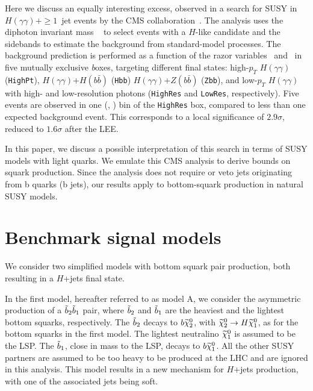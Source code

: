Here we discuss an equally interesting excess, observed in a search for SUSY in $H (\gamma\gamma)+ \geq 1$~jet events by the CMS collaboration~\cite{RazorHgaga}. The analysis uses the diphoton invariant mass \mgaga~ to select events with a $H$-like candidate and the \mgaga~ sidebands to estimate the background from standard-model processes. The background prediction is performed as a function of the razor variables \MR~and \Rsq~in five mutually exclusive {\textit boxes}, targeting different final states: high-$p_T$ $H (\gamma\gamma)$ (\texttt{HighPt}), $H (\gamma\gamma)$+$H (b \bar b)$ (\texttt{Hbb}) $H (\gamma\gamma)$+$Z (b \bar b)$ (\texttt{Zbb}), and low-$p_T$ $H (\gamma\gamma)$ with high- and low-resolution photons (\texttt{HighRes} and \texttt{LowRes}, respectively). Five events are observed in one (\MR, \Rsq) bin of the \texttt{HighRes} box, compared to less than one expected background event. This corresponds to a local significance of $2.9\sigma$, reduced to $1.6\sigma$ after the LEE. 

In this paper, we discuss a possible interpretation of this search in terms of SUSY models with light quarks. We emulate this CMS analysis to derive bounds on squark production. Since the analysis does not require or veto jets originating from b quarks (b jets), our results apply to bottom-squark production in natural SUSY models. 

\section{Benchmark signal models}
\label{sec:models}

We consider two simplified models with bottom squark pair production, both
resulting in a $H$+jets final state.

In the first model, hereafter referred to as model A, we consider the
asymmetric production of a $\tilde{b}_2
\tilde{b}_1$ pair, where $\tilde{b}_2$ and $\tilde{b}_1$ are the heaviest
and the lightest bottom squarks, respectively. The $\tilde{b}_2$ decays
to $b \widetilde{\chi}^{0}_2$, with $\widetilde{\chi}^{0}_2 \to H \widetilde{\chi}^{0}_1$, as for the bottom
squarks in the first model. The lightest neutralino $\widetilde{\chi}^{0}_1$ is
assumed to be the LSP. The $\tilde{b}_1$, close in mass to the LSP,
decays to $b \widetilde{\chi}^{0}_1$. All the other SUSY partners are assumed to be
too heavy to be produced at the LHC and are ignored in this analysis. This model results in a new mechanism for
$H$+jets production, with one of the associated jets being soft. 

